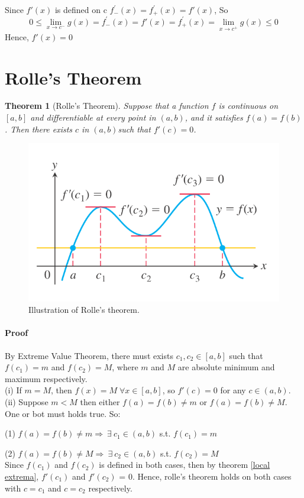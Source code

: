 \documentclass[12pt]{article}
\newtheorem{theorem}{Theorem}
\begin{document}
\noindent
Since $f'(x)$ is defined on c $f^{'}_{-} (x) = f^{'}_{+} (x) = f'(x)$, So
\[
    0 \leq \lim_{x \to c^{ - }} g(x) = f^{'}_{-} (x) = f'(x) = f^{'}_{+} (x) = \lim_{x \to c^{ + }} g(x) \leq 0
\]
Hence, $f'(x) = 0$

\section{Rolle's Theorem}
\begin{theorem}[Rolle's Theorem] 
    Suppose that a function $f$ is continuous on $[a, b]$ and differentiable at every point in $(a, b)$, and it satisfies $f(a) = f(b)$.
    Then there exists $c$ in $(a, b)$such that $f'(c) = 0$.
\end{theorem}

\begin{figure}[h!]
     \centering
     \includegraphics[width = 0.5\linewidth]{Images/rolle's theorem.png}
     \caption{Illustration of Rolle's theorem. }
\end{figure}

\paragraph{Proof}
By Extreme Value Theorem, there must exists $c_1, c_2 \in [a,b]$ such that $f(c_1) = m$ and $f(c_2) = M$, where 
$m$ and $M$ are absolute minimum and maximum respectively.  \\

\noindent
(i) If $m = M$, then $f(x) = M \; \forall x \in [a, b]$, so $f'(c) = 0$ for any $c \in (a, b)$.  \\
(ii) Suppose $m < M$ then either $f(a) = f(b) \neq m$ or $f(a) = f(b) \neq M$. One or bot must holds true. So:

(1) $f(a) = f(b) \neq m \Rightarrow \: \exists \: c_1 \in (a,b) $ s.t. $f(c_1) = m$ 

(2) $f(a) = f(b) \neq M \Rightarrow \: \exists \: c_2 \in (a,b) $ s.t. $f(c_2) = M$ \\

\noindent
Since $f(c_1)$ and $f(c_2)$ is defined in both cases, then by theorem \ref{local extrema}, $f'(c_1)$ and $f'(c_2)$ = 0. Hence, rolle's theorem
holds on both cases with $c = c_1$ and $c = c_2$ respectively.
\end{document}

